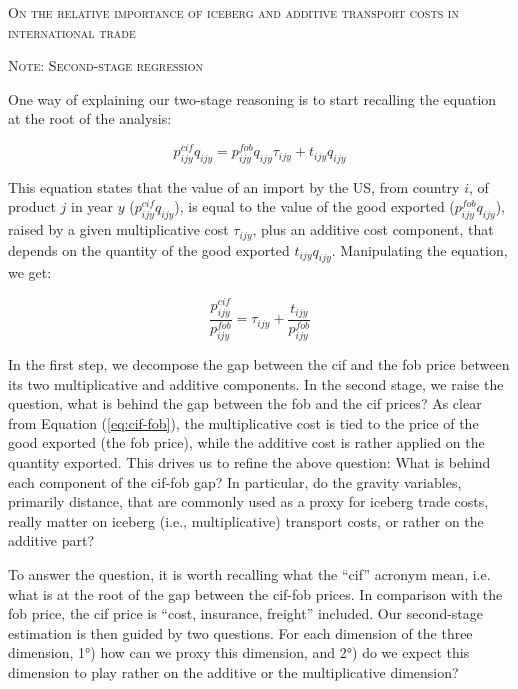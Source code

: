 \documentclass[a4paper,11pt]{article}
\begin{document}
\begin{center}

\textsc{On the relative importance of iceberg  and additive transport costs in international trade} \\ \vspace{1 cm}

\textsc{Note: Second-stage regression}

\end{center}


One way of explaining our two-stage reasoning is to start recalling the equation at the root of the analysis:

\begin{equation}
p^{cif}_{ijy} q_{ijy} = p^{fob}_{ijy} q_{ijy} \tau_{ijy} + t_{ijy} q_{ijy} \label{eq:cif-fob}
\end{equation}

This equation states that the value of an import by the US, from country $i$, of product $j$ in year $y$ ($p^{cif}_{ijy} q_{ijy}$), is equal to the value of the good exported ($p^{fob}_{ijy} q_{ijy}$), raised by a given multiplicative cost $\tau_{ijy}$, plus an additive cost component, that depends on the quantity of the good exported $ t_{ijy} q_{ijy}$. Manipulating the equation, we get:

\begin{equation}
\frac{p^{cif}_{ijy}}{p^{fob}_{ijy}} = \tau_{ijy} +\frac{t_{ijy}}{p^{fob}_{ijy}}
\label{eq:cif-fob2}
\end{equation}

In the first step, we decompose the gap between the cif and the fob price between its two multiplicative and additive components. In the second stage, we raise the question, what is behind the gap between the fob and the cif prices? As clear from Equation (\ref{eq:cif-fob}), the multiplicative cost is tied to the price of the good exported (the fob price), while the additive cost is rather applied on the quantity exported. This drives us to refine the above question: What is behind each component of the cif-fob gap? In particular, do the gravity variables, primarily distance, that are commonly used as a proxy for iceberg trade costs, really matter on iceberg (i.e., multiplicative) transport costs, or rather on the additive part? \medskip

To answer the question, it is worth recalling what the ``cif'' acronym mean, i.e. what is at the root of the gap between the cif-fob prices. In comparison with the fob price, the cif price is ``cost, insurance, freight'' included. Our second-stage estimation is then guided by two questions. For each dimension of the three dimension, 1°) how can we proxy this dimension, and 2°) do we expect this dimension to play rather on the additive or the multiplicative dimension?
\end{document}
